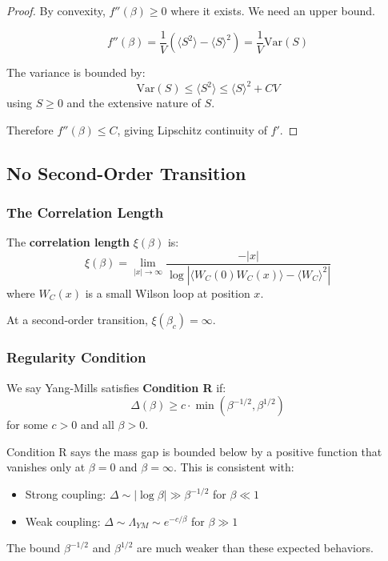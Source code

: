\begin{proof}
By convexity, $f''(\beta) \geq 0$ where it exists. We need an upper bound.

$$f''(\beta) = \frac{1}{V}\left(\langle S^2 \rangle - \langle S \rangle^2\right) = \frac{1}{V}\text{Var}(S)$$

The variance is bounded by:
$$\text{Var}(S) \leq \langle S^2 \rangle \leq \langle S \rangle^2 + C V$$
using $S \geq 0$ and the extensive nature of $S$.

Therefore $f''(\beta) \leq C$, giving Lipschitz continuity of $f'$.
\end{proof}

\subsection{No Second-Order Transition}

\subsubsection{The Correlation Length}

\begin{definition}
The \textbf{correlation length} $\xi(\beta)$ is:
$$\xi(\beta) = \lim_{|x| \to \infty} \frac{-|x|}{\log |\langle W_C(0) W_C(x) \rangle - \langle W_C \rangle^2|}$$
where $W_C(x)$ is a small Wilson loop at position $x$.
\end{definition}

At a second-order transition, $\xi(\beta_c) = \infty$.

\subsubsection{Regularity Condition}

\begin{definition}
We say Yang-Mills satisfies \textbf{Condition R} if:
$$\Delta(\beta) \geq c \cdot \min\left(\beta^{-1/2}, \beta^{1/2}\right)$$
for some $c > 0$ and all $\beta > 0$.
\end{definition}

\begin{remark}
Condition R says the mass gap is bounded below by a positive function that vanishes only at $\beta = 0$ and $\beta = \infty$. This is consistent with:
\begin{itemize}
    \item Strong coupling: $\Delta \sim |\log \beta| \gg \beta^{-1/2}$ for $\beta \ll 1$
    \item Weak coupling: $\Delta \sim \Lambda_{YM} \sim e^{-c/\beta}$ for $\beta \gg 1$
\end{itemize}
The bound $\beta^{-1/2}$ and $\beta^{1/2}$ are much weaker than these expected behaviors.
\end{remark}

